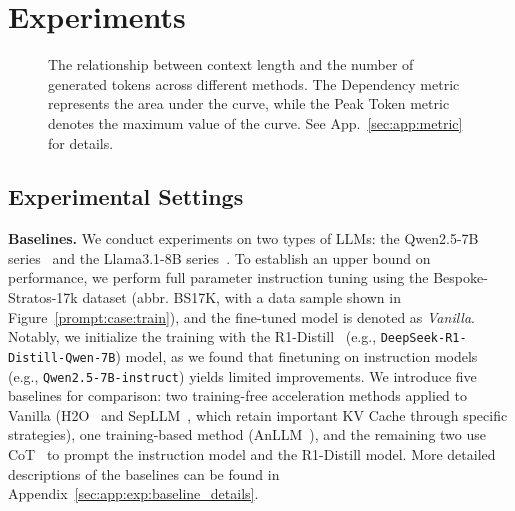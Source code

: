 \section{Experiments}
\begin{figure}[!t] %
    \centering
    \caption{
    The relationship between context length and the number of generated tokens across different methods. 
    The Dependency metric represents the area under the curve, while the Peak Token metric denotes the maximum value of the curve.
    See App.~\ref{sec:app:metric} for details.
    }
    \label{fig:exp:metric}
    \vspace{-2mm}
\end{figure} 

\subsection{Experimental Settings}




\textbf{Baselines.}
We conduct experiments on two types of LLMs: the Qwen2.5-7B series~\citep{arxiv24_qwen2_5} and the Llama3.1-8B series~\citep{arxiv24_llama_3}.
To establish an upper bound on performance, we perform full parameter instruction tuning using the Bespoke-Stratos-17k dataset (abbr. BS17K, with a data sample shown in Figure~\ref{prompt:case:train}), and the fine-tuned model is denoted as \textit{Vanilla}.  
Notably, we initialize the training with the R1-Distill~\citep{arxiv25_deepseek_r1} (e.g., \texttt{DeepSeek-R1-Distill-Qwen-7B}) model, as we found that finetuning on instruction models (e.g., \texttt{Qwen2.5-7B-instruct}) yields limited improvements.
We introduce five baselines for comparison: 
two training-free acceleration methods applied to Vanilla (H2O~\citep{nips23_h2o} and SepLLM~\citep{arxiv24_sepllm}, which retain important KV Cache through specific strategies), 
one training-based method (AnLLM~\citep{acl24_anllm}), 
and the remaining two use CoT~\citep{nips22_cot} to prompt the instruction model and the R1-Distill model. 
More detailed descriptions of the baselines can be found in Appendix~\ref{sec:app:exp:baseline_details}.  

